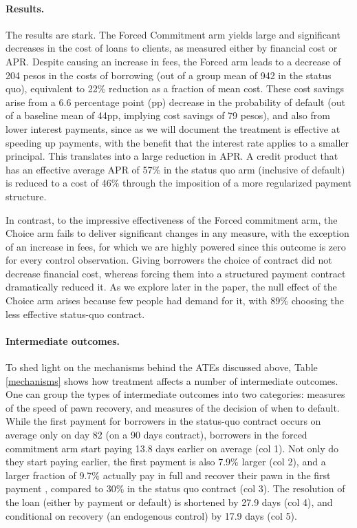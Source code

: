 \documentclass[oneside,11pt]{article}
\begin{document}
\paragraph{Results.} The results are stark. The Forced Commitment arm yields large and significant decreases in the cost of loans to clients, as measured either by financial cost or APR. Despite causing an increase in fees, the Forced arm leads to a decrease of 204 pesos in the costs of borrowing (out of a group mean of 942 in the status quo), equivalent to 22\% reduction as a fraction of mean cost. These cost savings arise from a 6.6 percentage point (pp) decrease in the probability of default (out of a baseline mean of 44pp,  implying cost savings of 79 pesos), and also from lower interest payments, since as we will document the treatment is effective at speeding up payments, with the benefit that the interest rate applies to a smaller principal. This translates into a large reduction in APR. A credit product that has an effective average APR of 57\% in the status quo arm (inclusive of default) is reduced to a cost of 46\% through the imposition of a more regularized payment structure.  

In contrast, to the impressive effectiveness of the Forced commitment arm, the Choice arm fails to deliver significant changes in any measure, with the exception of an increase in fees, for which we are highly powered since this outcome is zero for every control observation. Giving borrowers the choice of contract did not decrease financial cost, whereas forcing them into a structured payment contract dramatically reduced it. As we explore later in the paper, the null effect of the Choice arm arises because few people had demand for it, with 89\% choosing the less effective status-quo contract.

\paragraph{Intermediate outcomes.} To shed light on the mechanisms behind the ATEs discussed above, Table \ref{mechanisms} shows how treatment affects a number of intermediate outcomes. One can group the types of intermediate outcomes into two categories: measures of the speed of pawn recovery, and measures of the decision of when to default. While the first payment for borrowers in the status-quo contract occurs on average only on day 82 (on a 90 days contract), borrowers in the forced commitment arm start paying 13.8 days earlier on average (col 1). Not only do they start paying earlier, the first payment is also 7.9\% larger (col 2), and a larger fraction of 9.7\% actually pay in full and recover their pawn in the first payment , compared to 30\% in the status quo contract (col 3). The resolution of the loan (either by payment or default) is shortened by 27.9 days (col 4), and conditional on recovery (an endogenous control) by 17.9 days (col 5).
\end{document}
